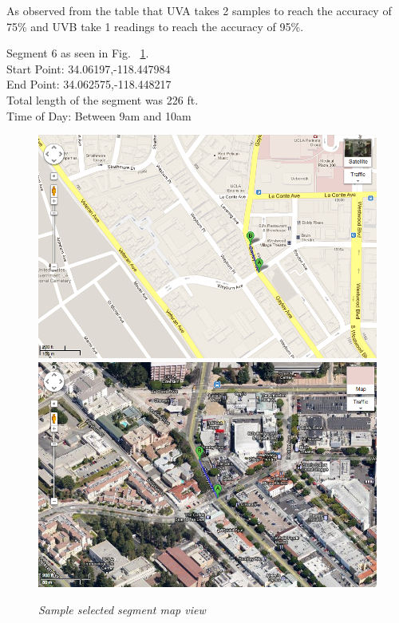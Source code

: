 \documentclass[12pt,fullpage,doublespace]{article}
\begin{document}
As observed from the table that UVA takes 2 samples to reach the accuracy of 75\% and UVB take 1 readings to reach the accuracy of 95\%. 
\newpage\newpage
\begin{center}
Segment 6 as seen in Fig. ~\ref{fig:segment6}. \\
Start Point:  34.06197,-118.447984\\
End Point:  34.062575,-118.448217 \\
Total length of the segment was 226 ft.\\
Time of Day: Between 9am and 10am\\
\begin{figure}[h]
\begin{center}
\includegraphics[scale=0.32]{segment6a.png}
\includegraphics[scale=0.32]{segment6b.png}
\caption{\small \sl Sample selected segment map view}\label{fig:segment6}
\end{center}
\end{figure}
\end{center}
\end{document}
